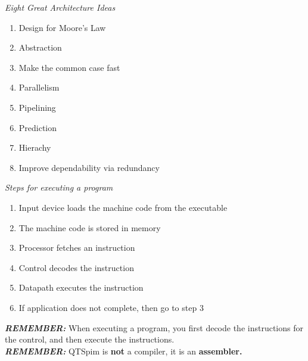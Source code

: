 \documentclass{book}
\begin{document}
	\noindent \emph{Eight Great Architecture Ideas}
	\begin{enumerate}
		  \item Design for Moore's Law
		  \item Abstraction
		  \item Make the common case fast
		  \item Parallelism
		  \item Pipelining
		  \item Prediction
		  \item Hierachy
  		\item Improve dependability via redundancy
	\end{enumerate}

	\noindent \emph{Steps for executing a program}
	\begin{enumerate}
  		\item Input device loads the machine code from the executable
  		\item The machine code is stored in memory
  		\item Processor fetches an instruction
  		\item Control decodes the instruction
  		\item Datapath executes the instruction
  		\item If application does not complete, then go to step 3
	\end{enumerate}
	\noindent \emph{\textbf{REMEMBER:}} When executing a program, you first decode the instructions for the control, and then execute the instructions.\\

	\noindent \emph{\textbf{REMEMBER:}} QTSpim is \textbf{not} a compiler, it is an \textbf{assembler.}\\
\end{document}
